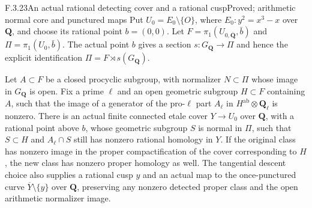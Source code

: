 \begin{result}{F.3.23}{An actual rational detecting cover and a rational cusp}{Proved; arithmetic normal core and punctured maps}
Put $U_0=E_0\setminus\{O\}$, where $E_0:y^2=x^3-x$ over
$\mathbf Q$, and choose its rational point $b=(0,0)$.
Let $F=\pi_1(U_{0,\overline{\mathbf Q}},\bar b)$ and
$\Pi=\pi_1(U_0,\bar b)$. The actual point $b$ gives a section
$s:G_{\mathbf Q}\to\Pi$ and hence the explicit identification
$\Pi=F\rtimes s(G_{\mathbf Q})$.

Let $A\subset F$ be a closed procyclic subgroup, with normalizer
$N\subset\Pi$ whose image in $G_{\mathbf Q}$ is open. Fix a prime
$\ell$ and an open geometric subgroup $H\subset F$ containing
$A$, such that the image of a generator of the pro-$\ell$ part
$A_\ell$ in $H^{\mathrm{ab}}\otimes\mathbf Q_\ell$ is nonzero.
There is an actual finite connected etale cover $Y\to U_0$ over
$\mathbf Q$, with a rational point above $b$, whose geometric
subgroup $S$ is normal in $\Pi$, such that
$S\subset H$ and $A_\ell\cap S$ still has nonzero rational
homology in $Y$. If the original class has nonzero image in
the proper compactification of the cover corresponding to $H$,
the new class has nonzero proper homology as well.
The tangential descent choice also supplies a rational
cusp $y$ and an actual map to the once-punctured curve
$\overline Y\setminus\{y\}$ over $\mathbf Q$, preserving
any nonzero detected proper class and the open arithmetic
normalizer image.

\end{result}
